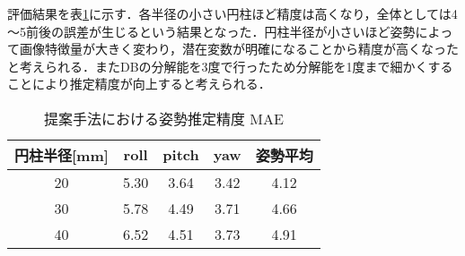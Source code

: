 \documentclass{jsarticle}
\begin{document}
評価結果を表\ref{hyouka}に示す．各半径の小さい円柱ほど精度は高くなり，全体としては4～5前後の誤差が生じるという結果となった．円柱半径が小さいほど姿勢によって画像特徴量が大きく変わり，潜在変数が明確になることから精度が高くなったと考えられる．またDBの分解能を3度で行ったため分解能を1度まで細かくすることにより推定精度が向上すると考えられる．




\begin{table}[h]
        \vspace{0zh}
          \begin{center}
            \caption{提案手法における姿勢推定精度 MAE}
            \label{hyouka}
            \begin{tabular}{c|c|c|c|c} \hline
              円柱半径[mm]   & roll& pitch & yaw&姿勢平均 \\ \hline
              20& 5.30 & 3.64 & 3.42 &4.12\\ \hline
              30&5.78 & 4.49 & 3.71& 4.66 \\ \hline
              40&6.52 &4.51  &3.73&4.91 \\ \hline
              \end{tabular}
          \end{center}
        \vspace{-1.0zh}
\end{table}



\end{document}
